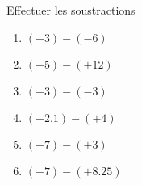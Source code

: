 
\begin{exercice}\label{exo2smath-0215}

    Effectuer les soustractions 
    \begin{multicols}{2}
        \begin{enumerate}
            \item
 $(+3)-(-6)$
\item
$ (-5)-(+12)$
\item
 $(-3)-(-3)$
\item
$ (+2.1)-(+4)$
\item
$ (+7)-(+3)$
\item
 $(-7)-(+8.25)$
        \end{enumerate}
    \end{multicols}

\end{exercice}
